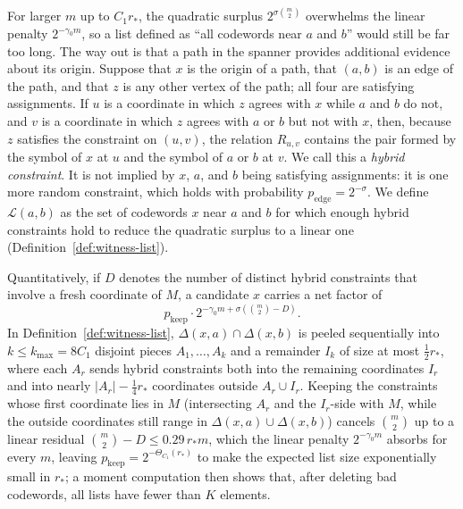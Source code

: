 \documentclass[11pt]{article}
\theoremstyle{definition}
\theoremstyle{remark}
\begin{document}
For larger $m$ up to $C_1 r_*$, the quadratic surplus $2^{\sigma \binom{m}{2}}$ overwhelms the linear penalty $2^{-\gamma_0 m}$, so a list defined as ``all codewords near $a$ and $b$'' would still be far too long. The way out is that a path in the spanner provides additional evidence about its origin. Suppose that $x$ is the origin of a path, that $(a, b)$ is an edge of the path, and that $z$ is any other vertex of the path; all four are satisfying assignments. If $u$ is a coordinate in which $z$ agrees with $x$ while $a$ and $b$ do not, and $v$ is a coordinate in which $z$ agrees with $a$ or $b$ but not with $x$, then, because $z$ satisfies the constraint on $(u, v)$, the relation $R_{u, v}$ contains the pair formed by the symbol of $x$ at $u$ and the symbol of $a$ or $b$ at $v$. We call this a \emph{hybrid constraint}. It is not implied by $x$, $a$, and $b$ being satisfying assignments: it is one more random constraint, which holds with probability $p_{\mathrm{edge}} = 2^{-\sigma}$. We define $\mathcal{L}(a, b)$ as the set of codewords $x$ near $a$ and $b$ for which enough hybrid constraints hold to reduce the quadratic surplus to a linear one (Definition~\ref{def:witness-list}).

Quantitatively, if $D$ denotes the number of distinct hybrid constraints that involve a fresh coordinate of $M$, a candidate $x$ carries a net factor of
\[
p_{\mathrm{keep}} \cdot 2^{-\gamma_0 m + \sigma(\binom{m}{2} - D)}.
\]
In Definition~\ref{def:witness-list}, $\Delta(x, a) \cap \Delta(x, b)$ is peeled sequentially into $k \le k_{\max} = 8 C_1$ disjoint pieces $A_1, \dots, A_k$ and a remainder $I_k$ of size at most $\frac{1}{2} r_*$, where each $A_r$ sends hybrid constraints both into the remaining coordinates $I_r$ and into nearly $|A_r| - \frac{1}{4} r_*$ coordinates outside $A_r \cup I_r$. Keeping the constraints whose first coordinate lies in $M$ (intersecting $A_r$ and the $I_r$-side with $M$, while the outside coordinates still range in $\Delta(x, a) \cup \Delta(x, b)$) cancels $\binom{m}{2}$ up to a linear residual $\binom{m}{2} - D \le 0.29\,r_* m$, which the linear penalty $2^{-\gamma_0 m}$ absorbs for every $m$, leaving $p_{\mathrm{keep}} = 2^{-\Theta_{C_1}(r_*)}$ to make the expected list size exponentially small in $r_*$; a moment computation then shows that, after deleting bad codewords, all lists have fewer than $K$ elements.
\end{document}
